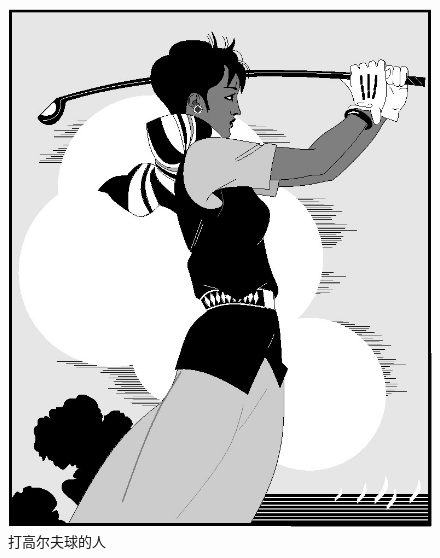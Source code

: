 \begin{figure}[htbp]
  \centering
  \begin{minipage}[t]{0.4\textwidth}
    \centering
    \includegraphics[width=\textwidth]{golfer}
    \caption{打高尔夫球的人}
    \label{golfer5}
  \end{minipage}
  \centering
  \begin{minipage}[t]{0.4\textwidth}
    \centering

\end{minipage}
\end{figure}
